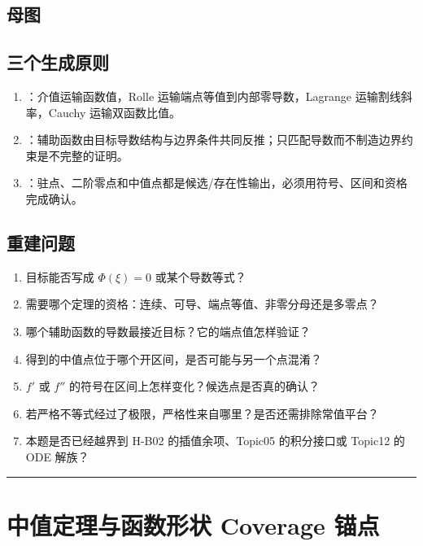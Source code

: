 \documentclass[UTF8,fontset=none,11pt,a4paper]{ctexart}
\begin{document}
\subsection{母图}
\begin{processchain}
\end{processchain}

\subsection{三个生成原则}
\begin{enumerate}
  \item {}：介值运输函数值，Rolle 运输端点等值到内部零导数，Lagrange 运输割线斜率，Cauchy 运输双函数比值。
  \item {}：辅助函数由目标导数结构与边界条件共同反推；只匹配导数而不制造边界约束是不完整的证明。
  \item {}：驻点、二阶零点和中值点都是候选/存在性输出，必须用符号、区间和资格完成确认。
\end{enumerate}

\subsection{重建问题}
\begin{enumerate}
  \item 目标能否写成 $\Phi(\xi)=0$ 或某个导数等式？
  \item 需要哪个定理的资格：连续、可导、端点等值、非零分母还是多零点？
  \item 哪个辅助函数的导数最接近目标？它的端点值怎样验证？
  \item 得到的中值点位于哪个开区间，是否可能与另一个点混淆？
  \item $f'$ 或 $f''$ 的符号在区间上怎样变化？候选点是否真的确认？
  \item 若严格不等式经过了极限，严格性来自哪里？是否还需排除常值平台？
  \item 本题是否已经越界到 H-B02 的插值余项、Topic05 的积分接口或 Topic12 的 ODE 解族？
\end{enumerate}

\begin{center}\rule{0.5\linewidth}{0.5pt}\end{center}

\appendix
\section{中值定理与函数形状 Coverage 锚点}
\end{document}
